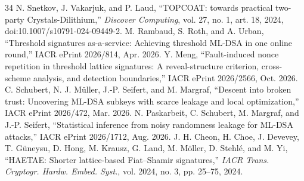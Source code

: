 \documentclass[10pt,conference,a4paper]{IEEEtran}
\begin{document}
\begin{thebibliography}{34}
 N. Snetkov, J. Vakarjuk, and P. Laud, ``TOPCOAT: towards practical two-party Crystals-Dilithium,'' \emph{Discover Computing}, vol. 27, no. 1, art. 18, 2024, doi:10.1007/s10791-024-09449-2.
 M. Rambaud, S. Roth, and A. Urban, ``Threshold signatures as-a-service: Achieving threshold ML-DSA in one online round,'' IACR ePrint 2026/814, Apr. 2026.
 Y. Meng, ``Fault-induced nonce repetition in threshold lattice signatures: A reveal-structure criterion, cross-scheme analysis, and detection boundaries,'' IACR ePrint 2026/2566, Oct. 2026.
 C. Schubert, N. J. M\"uller, J.-P. Seifert, and M. Margraf, ``Descent into broken trust: Uncovering ML-DSA subkeys with scarce leakage and local optimization,'' IACR ePrint 2026/472, Mar. 2026.
 N. Paskarbeit, C. Schubert, M. Margraf, and J.-P. Seifert, ``Statistical inference from noisy randomness leakage for ML-DSA attacks,'' IACR ePrint 2026/1712, Aug. 2026.
 J. H. Cheon, H. Choe, J. Devevey, T. G\"uneysu, D. Hong, M. Krausz, G. Land, M. M\"oller, D. Stehl\'e, and M. Yi, ``HAETAE: Shorter lattice-based Fiat--Shamir signatures,'' \emph{IACR Trans. Cryptogr. Hardw. Embed. Syst.}, vol. 2024, no. 3, pp. 25--75, 2024.
\end{thebibliography}
\end{document}
